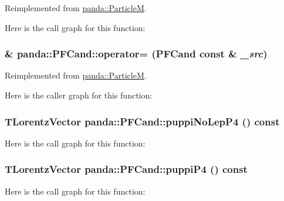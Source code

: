 Reimplemented from \hyperlink{classpanda_1_1ParticleM_a042f9e295576be022960ea88144e9022}{panda::ParticleM}.

Here is the call graph for this function:\hypertarget{classpanda_1_1PFCand_ad32d7ae95ef68eb076604648684aca06}{
\subsubsection[{operator=}]{ \& panda::PFCand::operator= ({\bf PFCand} const \& {\em \_\-src})}}
\label{classpanda_1_1PFCand_ad32d7ae95ef68eb076604648684aca06}


Reimplemented from \hyperlink{classpanda_1_1ParticleM_a37f7be4e1150b6080b47b005af730af5}{panda::ParticleM}.

Here is the caller graph for this function:\hypertarget{classpanda_1_1PFCand_a3091b11c1f77e1a3ab0ed5954baa5354}{
\subsubsection[{puppiNoLepP4}]{\setlength{\rightskip}{0pt plus 5cm}TLorentzVector panda::PFCand::puppiNoLepP4 () const}}
\label{classpanda_1_1PFCand_a3091b11c1f77e1a3ab0ed5954baa5354}


Here is the call graph for this function:\hypertarget{classpanda_1_1PFCand_a5c5f399c11e2f6aa60e8f1c093946cc0}{
\subsubsection[{puppiP4}]{\setlength{\rightskip}{0pt plus 5cm}TLorentzVector panda::PFCand::puppiP4 () const}}
\label{classpanda_1_1PFCand_a5c5f399c11e2f6aa60e8f1c093946cc0}


Here is the call graph for this function:

